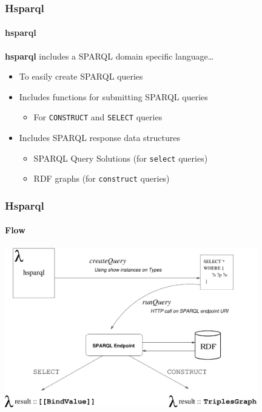 \documentclass{beamer}
\begin{document}
\begin{frame}[fragile]
\frametitle{Hsparql}
\framesubtitle{hsparql}

\textbf{hsparql} includes a SPARQL domain specific language\ldots

\begin{itemize}
\item To easily create SPARQL queries
  
\item Includes functions for submitting SPARQL queries
  
  \begin{itemize}
  \item For \texttt{CONSTRUCT} and \texttt{SELECT} queries
  \end{itemize}
  
\item Includes SPARQL response data structures
  
  \begin{itemize}
  \item SPARQL Query Solutions (for \texttt{select} queries)
  \item RDF graphs (for \texttt{construct} queries)
  \end{itemize}

\end{itemize}

\end{frame}

\begin{frame}
\frametitle{Hsparql}
\framesubtitle{Flow}

\begin{center}
\includegraphics[width=110mm]{images/hsparql-flow.pdf}
\end{center}


\end{frame}
\end{document}
